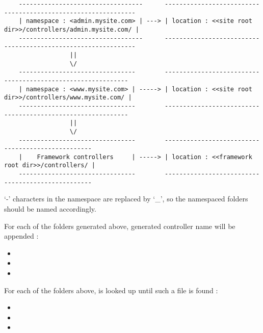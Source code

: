 \documentclass[pdftex,12pt,a4paper]{article}
\begin{document}
\begin{center}
\begin{unbreakable}
{\scriptsize
\begin{verbatim}
	----------------------------------      --------------------------------------------------------------
	| namespace : <admin.mysite.com> | ---> | location : <<site root dir>>/controllers/admin.mysite.com/ |
	----------------------------------      --------------------------------------------------------------
	              ||
	              \/
	--------------------------------        ------------------------------------------------------------
	| namespace : <www.mysite.com> | -----> | location : <<site root dir>>/controllers/www.mysite.com/ |
	--------------------------------        ------------------------------------------------------------
	              ||
	              \/
	--------------------------------        --------------------------------------------------
	|    Framework controllers     | -----> | location : <<framework root dir>>/controllers/ |
	--------------------------------        --------------------------------------------------
\end{verbatim}
}
\end{unbreakable}
\end{center}
\begin{note}
`-' characters in the namespace are replaced by `\_', so the namespaced folders should be named accordingly.
\end{note}

For each of the folders generated above, generated controller name  will be appended :
\begin{itemize}
	\item {}
	\item {}
	\item {}
\end{itemize}

For each of the folders above,  is looked up until such a file is found :
\begin{itemize}
	\item {}
	\item {}
	\item {}
\end{itemize}
\end{document}
